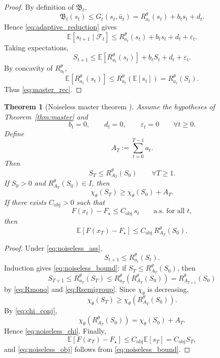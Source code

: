 \documentclass{article}
\newtheorem{theorem}{Theorem}[section]
\theoremstyle{definition}
\begin{document}
\begin{proof}
By definition of $\mathfrak B_t$,
\[
\mathfrak B_t(s_t)\le G_t(s_t,\bar u_t)=R_{a_t}^\theta(s_t)+b_t s_t+d_t.
\]
Hence \eqref{eq:adaptive_reduction} gives
\[
\mathbb E[s_{t+1}\mid\mathcal F_t]
\le
R_{a_t}^\theta(s_t)+b_t s_t+d_t+\varepsilon_t.
\]
Taking expectations,
\[
S_{t+1}
\le
\mathbb E[R_{a_t}^\theta(s_t)] + b_tS_t+d_t+\varepsilon_t.
\]
By concavity of $R_{a_t}^\theta$,
\[
\mathbb E[R_{a_t}^\theta(s_t)]
\le
R_{a_t}^\theta(\mathbb E[s_t])
=
R_{a_t}^\theta(S_t).
\]
Thus \eqref{eq:master_rec}.
\end{proof}

\begin{theorem}[Noiseless master theorem {\cite{Bellman}}]
\label{thm:noiseless}
Assume the hypotheses of Theorem~\ref{thm:master} and
\begin{equation}
b_t=0,
\qquad
d_t=0,
\qquad
\varepsilon_t=0
\qquad
\forall t\ge 0.
\label{eq:noiseless_ass}
\end{equation}
Define
\begin{equation*}
A_T:=\sum_{t=0}^{T-1}a_t.
\end{equation*}
Then
\begin{equation}
S_T\le R_{A_T}^\theta(S_0)
\qquad
\forall T\ge 1.
\label{eq:noiseless_bound}
\end{equation}
If $S_0>0$ and $R_{A_T}^\theta(S_0)\in I$, then
\begin{equation}
\chi_\theta(S_T)\ge \chi_\theta(S_0)+A_T.
\label{eq:noiseless_chi}
\end{equation}
If there exists $C_{\mathrm{obj}}>0$ such that
\begin{equation}
F(x_t)-F_\star\le C_{\mathrm{obj}}\,s_t
\qquad
\text{a.s. for all }t,
\label{eq:obj_dom}
\end{equation}
then
\begin{equation}
\mathbb E[F(x_T)-F_\star]
\le
C_{\mathrm{obj}}\,R_{A_T}^\theta(S_0).
\label{eq:noiseless_obj}
\end{equation}
\end{theorem}

\begin{proof}
Under \eqref{eq:noiseless_ass},
\[
S_{t+1}\le R_{a_t}^\theta(S_t).
\]
Induction gives \eqref{eq:noiseless_bound}: if $S_T\le R_{A_T}^\theta(S_0)$, then
\[
S_{T+1}
\le
R_{a_T}^\theta(S_T)
\le
R_{a_T}^\theta(R_{A_T}^\theta(S_0))
=
R_{A_{T+1}}^\theta(S_0)
\]
by \eqref{eq:Rmono} and \eqref{eq:Rsemigroup}.
Since $\chi_\theta$ is decreasing,
\[
\chi_\theta(S_T)\ge \chi_\theta(R_{A_T}^\theta(S_0)).
\]
By \eqref{eq:chi_conj},
\[
\chi_\theta(R_{A_T}^\theta(S_0))=\chi_\theta(S_0)+A_T.
\]
Hence \eqref{eq:noiseless_chi}.
Finally,
\[
\mathbb E[F(x_T)-F_\star]\le C_{\mathrm{obj}}\mathbb E[s_T]=C_{\mathrm{obj}}S_T,
\]
and \eqref{eq:noiseless_obj} follows from \eqref{eq:noiseless_bound}.
\end{proof}
\end{document}
